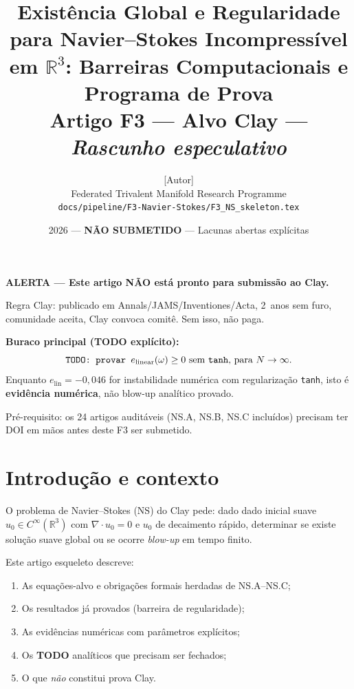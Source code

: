 \documentclass[12pt,a4paper]{article}
\title{%
  Exist\^encia Global e Regularidade para Navier--Stokes Incompress\'ivel\\
  em $\mathbb{R}^3$: Barreiras Computacionais e Programa de Prova\\[4pt]
  {\large \textbf{Artigo F3} --- Alvo Clay --- \emph{Rascunho especulativo}}%
}
\author{%
  [Autor]\\
  {\small Federated Trivalent Manifold Research Programme}\\
  {\small \texttt{docs/pipeline/F3-Navier-Stokes/F3\_NS\_skeleton.tex}}
}
\date{2026 --- \textbf{NÃO SUBMETIDO} --- Lacunas abertas explícitas}
\theoremstyle{definition}
\begin{document}
\maketitle

\begin{mdframed}[backgroundcolor=red!12, linewidth=2.5pt, linecolor=red!70!black]
\textbf{\large ALERTA --- Este artigo NÃO está pronto para submissão ao Clay.}

\medskip
Regra Clay: publicado em Annals/JAMS/Inventiones/Acta, 2~anos sem furo,
comunidade aceita, Clay convoca comitê. Sem isso, não paga.

\medskip
\textbf{Buraco principal (TODO explícito):}
\[
  \texttt{TODO: provar } e_{\mathrm{linear}}(\omega) \ge 0
  \text{ sem \texttt{tanh}, para } N \to \infty.
\]
Enquanto $e_{\mathrm{lin}} = -0{,}046$ for instabilidade numérica
com regularização \texttt{tanh}, isto é \textbf{evidência numérica},
não blow-up analítico provado.

\medskip
Pré-requisito: os 24 artigos auditáveis (NS.A, NS.B, NS.C incluídos)
precisam ter DOI em mãos antes deste F3 ser submetido.
\end{mdframed}

\tableofcontents
\newpage

\section{Introdução e contexto}

O problema de Navier--Stokes (NS) do Clay pede:
dado dado inicial suave $u_0 \in C^\infty(\mathbb{R}^3)$ com
$\nabla \cdot u_0 = 0$ e $u_0$ de decaimento rápido,
determinar se existe solução suave global ou se ocorre
\emph{blow-up} em tempo finito.

Este artigo esqueleto descreve:
\begin{enumerate}
  \item As equações-alvo e obrigações formais herdadas de NS.A--NS.C;
  \item Os resultados já provados (barreira de regularidade);
  \item As evidências numéricas com parâmetros explícitos;
  \item Os \textbf{TODO} analíticos que precisam ser fechados;
  \item O que \emph{não} constitui prova Clay.
\end{enumerate}
\end{document}
